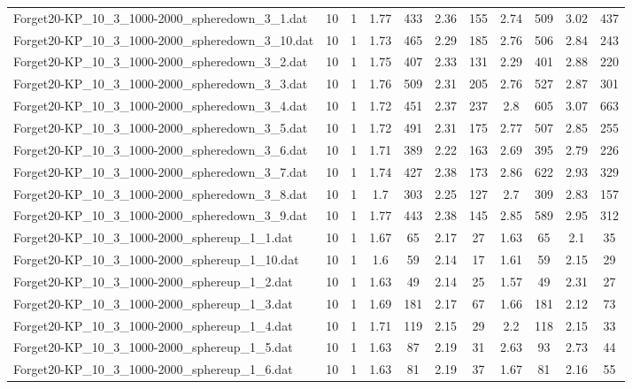 \begin{table}[!ht]
\begin{tabular}{lcccccccccc}
Forget20-KP\_10\_3\_1000-2000\_spheredown\_3\_1.dat & 10 & 1 & 1.77 & 433 & 2.36 & 155 & 2.74 & 509 & 3.02 & 437 \\
Forget20-KP\_10\_3\_1000-2000\_spheredown\_3\_10.dat & 10 & 1 & 1.73 & 465 & 2.29 & 185 & 2.76 & 506 & 2.84 & 243 \\
Forget20-KP\_10\_3\_1000-2000\_spheredown\_3\_2.dat & 10 & 1 & 1.75 & 407 & 2.33 & 131 & 2.29 & 401 & 2.88 & 220 \\
Forget20-KP\_10\_3\_1000-2000\_spheredown\_3\_3.dat & 10 & 1 & 1.76 & 509 & 2.31 & 205 & 2.76 & 527 & 2.87 & 301 \\
Forget20-KP\_10\_3\_1000-2000\_spheredown\_3\_4.dat & 10 & 1 & 1.72 & 451 & 2.37 & 237 & 2.8 & 605 & 3.07 & 663 \\
Forget20-KP\_10\_3\_1000-2000\_spheredown\_3\_5.dat & 10 & 1 & 1.72 & 491 & 2.31 & 175 & 2.77 & 507 & 2.85 & 255 \\
Forget20-KP\_10\_3\_1000-2000\_spheredown\_3\_6.dat & 10 & 1 & 1.71 & 389 & 2.22 & 163 & 2.69 & 395 & 2.79 & 226 \\
Forget20-KP\_10\_3\_1000-2000\_spheredown\_3\_7.dat & 10 & 1 & 1.74 & 427 & 2.38 & 173 & 2.86 & 622 & 2.93 & 329 \\
Forget20-KP\_10\_3\_1000-2000\_spheredown\_3\_8.dat & 10 & 1 & 1.7 & 303 & 2.25 & 127 & 2.7 & 309 & 2.83 & 157 \\
Forget20-KP\_10\_3\_1000-2000\_spheredown\_3\_9.dat & 10 & 1 & 1.77 & 443 & 2.38 & 145 & 2.85 & 589 & 2.95 & 312 \\
Forget20-KP\_10\_3\_1000-2000\_sphereup\_1\_1.dat & 10 & 1 & 1.67 & 65 & 2.17 & 27 & 1.63 & 65 & 2.1 & 35 \\
Forget20-KP\_10\_3\_1000-2000\_sphereup\_1\_10.dat & 10 & 1 & 1.6 & 59 & 2.14 & 17 & 1.61 & 59 & 2.15 & 29 \\
Forget20-KP\_10\_3\_1000-2000\_sphereup\_1\_2.dat & 10 & 1 & 1.63 & 49 & 2.14 & 25 & 1.57 & 49 & 2.31 & 27 \\
Forget20-KP\_10\_3\_1000-2000\_sphereup\_1\_3.dat & 10 & 1 & 1.69 & 181 & 2.17 & 67 & 1.66 & 181 & 2.12 & 73 \\
Forget20-KP\_10\_3\_1000-2000\_sphereup\_1\_4.dat & 10 & 1 & 1.71 & 119 & 2.15 & 29 & 2.2 & 118 & 2.15 & 33 \\
Forget20-KP\_10\_3\_1000-2000\_sphereup\_1\_5.dat & 10 & 1 & 1.63 & 87 & 2.19 & 31 & 2.63 & 93 & 2.73 & 44 \\
Forget20-KP\_10\_3\_1000-2000\_sphereup\_1\_6.dat & 10 & 1 & 1.63 & 81 & 2.19 & 37 & 1.67 & 81 & 2.16 & 55 \\

\end{tabular}
\end{table}

